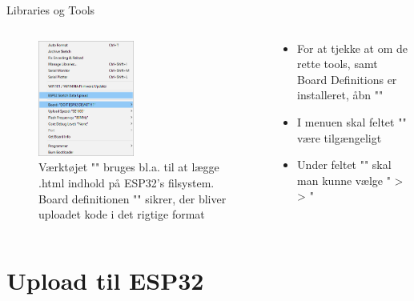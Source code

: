 \documentclass[aspectratio=169]{beamer}
\begin{document}
\begin{frame}{Libraries og Tools}
\begin{columns}
	\begin{column}{0.5\textwidth}
			\begin{figure}
  					\includegraphics[width=0.5\textwidth]{assets/pictures/sketch-data-and-board.png}
  					\caption{Værktøjet "" bruges bl.a. til at lægge .html indhold på ESP32's filsystem. Board definitionen "" sikrer, der bliver uploadet kode i det rigtige format}
  					\label{fig:sketch-data-and-board}
  			\end{figure}
	\end{column}
	\begin{column}{0.5\textwidth}
		\begin{textBox}
			\begin{itemize}
				\item For at tjekke at om de rette tools, samt Board Definitions er installeret, åbn ""
				\item I menuen skal feltet "" være tilgængeligt
				\item Under feltet "" skal man kunne vælge " >  > "
			\end{itemize}
		\end{textBox}
	\end{column}
\end{columns}
\end{frame}

\section{Upload til ESP32}
\begin{frame}
\end{frame}
\end{document}
